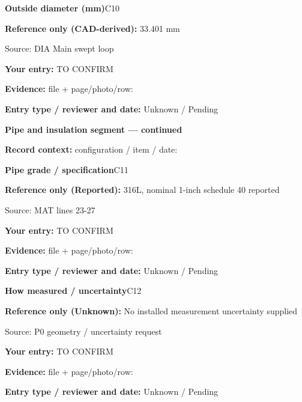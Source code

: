 \documentclass[11pt]{article}
\begin{document}
\par\noindent\begin{minipage}{\textwidth}\small
{\color{navy}\bfseries Outside diameter (mm)}\hfill C10\par
\colorbox{pale}{\parbox{\dimexpr\linewidth-2\fboxsep\relax}{
\textbf{Reference only (CAD-derived):} 33.401 mm\par
{\footnotesize Source: DIA Main swept loop}}}\par
\textbf{Your entry:} {\color{muted}TO CONFIRM}\enspace\hrulefill\par
{\footnotesize\textbf{Evidence:} file + page/photo/row: \hrulefill\par
\textbf{Entry type / reviewer and date:} Unknown / Pending\par
}\end{minipage}\par\vspace{5pt}
\clearpage
{\large\bfseries Pipe and insulation segment --- continued}\par
\textbf{Record context:} configuration / item / date: \hrulefill\par
\par\noindent\begin{minipage}{\textwidth}\small
{\color{navy}\bfseries Pipe grade / specification}\hfill C11\par
\colorbox{pale}{\parbox{\dimexpr\linewidth-2\fboxsep\relax}{
\textbf{Reference only (Reported):} 316L, nominal 1-inch schedule 40 reported\par
{\footnotesize Source: MAT lines 23-27}}}\par
\textbf{Your entry:} {\color{muted}TO CONFIRM}\enspace\hrulefill\par
{\footnotesize\textbf{Evidence:} file + page/photo/row: \hrulefill\par
\textbf{Entry type / reviewer and date:} Unknown / Pending\par
}\end{minipage}\par\vspace{5pt}
\par\noindent\begin{minipage}{\textwidth}\small
{\color{navy}\bfseries How measured / uncertainty}\hfill C12\par
\colorbox{pale}{\parbox{\dimexpr\linewidth-2\fboxsep\relax}{
\textbf{Reference only (Unknown):} No installed measurement uncertainty supplied\par
{\footnotesize Source: P0 geometry / uncertainty request}}}\par
\textbf{Your entry:} {\color{muted}TO CONFIRM}\enspace\hrulefill\par
{\footnotesize\textbf{Evidence:} file + page/photo/row: \hrulefill\par
\textbf{Entry type / reviewer and date:} Unknown / Pending\par
}\end{minipage}\par\vspace{5pt}
\end{document}
